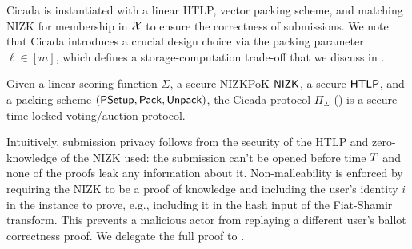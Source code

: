 Cicada is instantiated with a linear HTLP, vector packing scheme, and matching NIZK for membership in $\mathcal{X}$ to ensure the correctness of submissions. 
We note that Cicada introduces a crucial design choice via the packing parameter $\ell\in[m]$, which defines a storage-computation trade-off that we discuss in \cite{EPRINT:GSZB23}. %



\begin{theorem}\label{thm:cicada}
    Given a linear scoring function $\Sigma$, a secure NIZKPoK $\sf NIZK$, a secure $\mathsf{HTLP}$, and a packing scheme $({\sf PSetup}, \mathsf{Pack}, \mathsf{Unpack})$, the Cicada protocol $\Pi_\Sigma$ () is a secure time-locked voting/auction protocol. %
\end{theorem}

Intuitively, submission privacy follows from the security of the HTLP and zero-knowledge of the NIZK used: the submission can't be opened before time $T$ and none of the proofs leak any information about it. Non-malleability is enforced by requiring the NIZK to be a proof of knowledge and including the user's identity $i$ in the instance to prove, e.g., including it in the hash input of the Fiat-Shamir transform. This prevents a malicious actor from replaying a different user's ballot correctness proof.
We delegate the full proof to \cite{EPRINT:GSZB23}.


